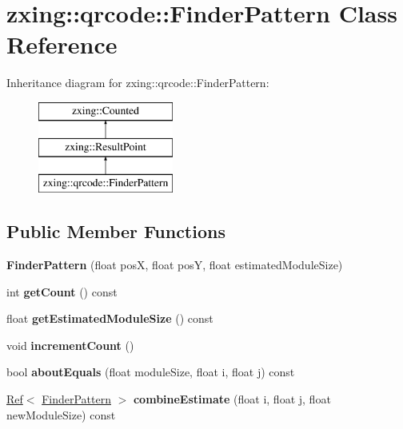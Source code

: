 \hypertarget{classzxing_1_1qrcode_1_1_finder_pattern}{}\section{zxing\+:\+:qrcode\+:\+:Finder\+Pattern Class Reference}
\label{classzxing_1_1qrcode_1_1_finder_pattern}
Inheritance diagram for zxing\+:\+:qrcode\+:\+:Finder\+Pattern\+:\begin{figure}[H]
\begin{center}
\leavevmode
\includegraphics[height=3.000000cm]{classzxing_1_1qrcode_1_1_finder_pattern}
\end{center}
\end{figure}
\subsection*{Public Member Functions}
\begin{DoxyCompactItemize}
\item 
\mbox{\label{classzxing_1_1qrcode_1_1_finder_pattern_a9a598feb6fd3ff48dcbd78e563876024}} 
{\bfseries Finder\+Pattern} (float posX, float posY, float estimated\+Module\+Size)
\item 
\mbox{\label{classzxing_1_1qrcode_1_1_finder_pattern_a1fc7ed4b971b0922ef973495b44a2a55}} 
int {\bfseries get\+Count} () const
\item 
\mbox{\label{classzxing_1_1qrcode_1_1_finder_pattern_a83c21750e640b6161962bc05535383d7}} 
float {\bfseries get\+Estimated\+Module\+Size} () const
\item 
\mbox{\label{classzxing_1_1qrcode_1_1_finder_pattern_aa98d82c0d0f51167f236007762279399}} 
void {\bfseries increment\+Count} ()
\item 
\mbox{\label{classzxing_1_1qrcode_1_1_finder_pattern_aec30de38a9f6a40b710acfb11640b7f1}} 
bool {\bfseries about\+Equals} (float module\+Size, float i, float j) const
\item 
\mbox{\label{classzxing_1_1qrcode_1_1_finder_pattern_a2869c5315bc7ac4736a34ab504acf67d}} 
\mbox{\hyperlink{classzxing_1_1_ref}{Ref}}$<$ \mbox{\hyperlink{classzxing_1_1qrcode_1_1_finder_pattern}{Finder\+Pattern}} $>$ {\bfseries combine\+Estimate} (float i, float j, float new\+Module\+Size) const
\end{DoxyCompactItemize}
